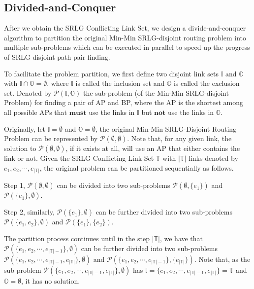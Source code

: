 

\subsection{Divided-and-Conquer}
\label{subsec:dividedconquer}
After we obtain the SRLG Conflicting Link Set, we design a divide-and-conquer algorithm to partition the original Min-Min SRLG-disjoint routing problem into multiple sub-problems which can be executed in parallel to speed up the progress of SRLG disjoint path pair finding.

To facilitate the problem partition, we first define two disjoint link sets $\mathbb{I}$ and ${\mathbb{O}}$ with $\mathbb{I}\cap {\mathbb{O}}= \emptyset$,  where $\mathbb{I}$ is called the  inclusion set and ${\mathbb{O}}$ is called the exclusion set. Denoted by $\mathcal{P}({\mathbb{I},\mathbb{O}})$ the sub-problem (of the Min-Min SRLG-disjoint Problem) for finding a pair of AP and BP, where the AP is the shortest among all possible APs that $\textbf{must}$ use the links in $\mathbb{I}$ but $\textbf{not}$ use the links in ${\mathbb{O}}$.

Originally, let $\mathbb{I}=\emptyset$ and ${\mathbb{O}}=\emptyset$, the original Min-Min  SRLG-Disjoint Routing Problem can be represented by $\mathcal{P}(\emptyset,\emptyset)$. Note that, for any given link, the solution to $\mathcal{P}(\emptyset,\emptyset)$, if it exists at all, will use an AP that either contains the link or not. Given the SRLG Conflicting Link Set $\mathbb{T}$ with $|\mathbb{T}|$ links denoted by ${e_1},{e_2}, \cdots ,{e_{\left| \mathbb{T} \right|}}$, the original problem can be partitioned sequentially as follows.

Step 1, $\mathcal{P}(\emptyset,\emptyset)$ can be  divided into two sub-problems $\mathcal{P}(\emptyset,\{e_1\})$ and $\mathcal{P}(\{e_1\},\emptyset)$.

Step 2, similarly, $\mathcal{P}(\{e_1\},\emptyset)$ can be further divided into two sub-problems $\mathcal{P}(\{e_1,e_2\},\emptyset)$ and $\mathcal{P}(\{e_1\},\{e_2\})$.

The partition process continues until in the step $|\mathbb{T}|$, we have that $\mathcal{P}(\{e_1,e_2,\cdots ,{e_{\left| \mathbb{T} \right|-1}}\},\emptyset)$ can be further divided into two sub-problems $\mathcal{P}(\{e_1,e_2,\cdots ,{e_{\left| \mathbb{T} \right|-1}}, {e_{\left| \mathbb{T} \right|}}\},\emptyset)$ and $\mathcal{P}(\{e_1,e_2,\cdots ,{e_{\left| \mathbb{T} \right|-1}}\},\{e_{\left| \mathbb{T} \right|}\})$. Note that, as the sub-problem $\mathcal{P}(\{e_1,e_2,\cdots ,{e_{\left| \mathbb{T} \right|-1}}, {e_{\left| \mathbb{T} \right|}}\},\emptyset)$ has ${\mathbb{I}=\{e_1,e_2,\cdots ,{e_{\left| \mathbb{T} \right|-1}}, {e_{\left| \mathbb{T} \right|}}\}}$$=\mathbb{T}$ and ${\mathbb{O}}=\emptyset$, it has no solution.

